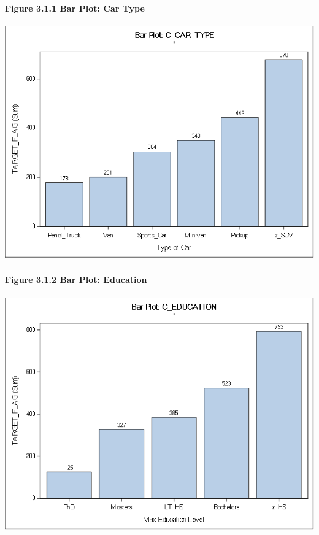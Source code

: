 \documentclass[]{article}
\let\oldparagraph\paragraph
\renewcommand{\paragraph}[1]{\oldparagraph{#1}\mbox{}}
\begin{document}
\newpage

\paragraph{Figure 3.1.1 Bar Plot: Car
Type}\label{figure-3.1.1-bar-plot-car-type}

\includegraphics[height=3.95833in]{images/bar_cartype.png}

\paragraph{Figure 3.1.2 Bar Plot:
Education}\label{figure-3.1.2-bar-plot-education}

\includegraphics[height=3.95833in]{images/bar_education.png}
\end{document}
